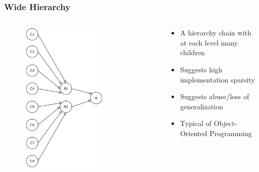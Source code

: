 \documentclass[dvipsnames, 10pt, table]{beamer}
\begin{document}
\begin{frame}
  \frametitle{Wide Hierarchy}
  \begin{columns}
    \begin{column}{0.5\textwidth}
      \begin{figure}
        \begin{center}
          \includegraphics[width=0.7\textwidth]{figures/architectural-smells/wide-hierarchy.png}
        \end{center}
      \end{figure}
    \end{column}
    \begin{column}{0.5\textwidth}
      \begin{itemize}
        \item A hierarchy chain with at each level many children
        \item Suggests high implementation sparsity
        \item Suggests abuse/loss of generalization
        \item Typical of Object-Oriented Programming
      \end{itemize}
    \end{column}
  \end{columns}
\end{frame}
\end{document}
